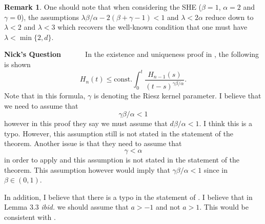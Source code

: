 \documentclass[a4paper,11pt]{article}
\numberwithin{equation}{section}
\theoremstyle{plain}
\theoremstyle{definition}
\newtheorem{remark}[theorem]{Remark}
\newcounter{NQ}
\newenvironment{NickQuestion}[1][] %
{\refstepcounter{NQ}
	\begin{mdframed}[backgroundcolor=lightgray]\textbf{Nick's Question \theNQ \: #1~~}~~~\noindent}%
	{\end{mdframed}}
\numberwithin{NQ}{section}
\numberwithin{LQ}{section}
\numberwithin{ZQ}{section}
\begin{document}
	\begin{remark}
		One should note that when considering the SHE ($\beta =1$, $\alpha=2$ and $\gamma=0$), the assumptions $\lambda \beta / \alpha - 2(\beta + \gamma -1) < 1$ and $\lambda < 2 \alpha$ reduce down to $\lambda<2$ and $\lambda <3$ which recovers the well-known condition that one must have $\lambda < \min\{2,d\}$.
	\end{remark}
	
	\begin{NickQuestion}
		In the existence and uniqueness proof in \cite[Theorem 1.10]{FN2016}, the following is shown 
		\[
		H_n(t) \le \text{const.} \int_0^t \frac{H_{n-1}(s)}{(t-s)^{\gamma \beta / \alpha}}.
		\]
		Note that in this formula, $\gamma$ is denoting the Riesz kernel parameter. I believe that we need to assume that 
		\[
		\gamma \beta / \alpha < 1
		\]
		however in this proof they say we must assume that $d\beta / \alpha < 1$. I think this is a typo. However, this assumption still is not stated in the statement of the theorem. Another issue is that they need to assume that 
		\[
		\gamma < \alpha
		\]
		in order to apply \cite[Lemma 2.7]{FN2016} and this assumption is not stated in the statement of the theorem. This assumption however would imply that $\gamma \beta / \alpha <1$ since in \cite{FN2016} $\beta \in (0,1)$.
		
		In addition, I believe that there is a typo in the statement of \cite[Lemma 3.3]{Walsh89}. I believe that in Lemma 3.3 {\it ibid.} we should assume that $a>-1$ and not $a >1$. This would be consistent with \cite[(3.14)]{Walsh89}.
	\end{NickQuestion}
	
\end{document}
